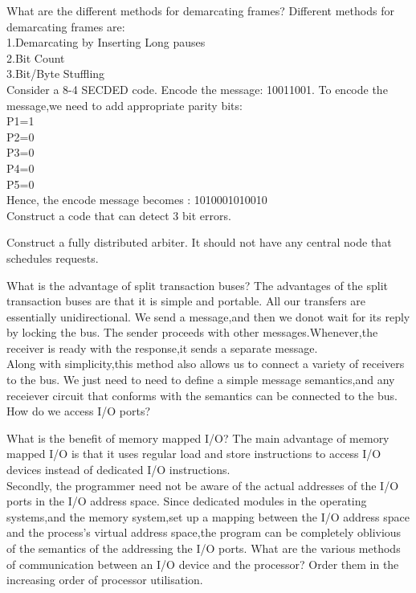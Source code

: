 \begin{ExerciseList}

\Exercise
What are the different methods for demarcating frames?
\Answer 
Different methods for demarcating frames are:\\
1.Demarcating by Inserting Long pauses\\
2.Bit Count\\
3.Bit/Byte Stuffling\\
\Exercise
Consider a 8-4 SECDED code. Encode the message: 10011001.
\Answer
To encode the message,we need to add appropriate parity bits:\\
P1=1\\
P2=0\\
P3=0\\
P4=0\\
P5=0\\
Hence, the encode message becomes :
1010001010010\\
\Exercise[difficulty=2]
Construct a code that can detect 3 bit errors.

\Exercise[difficulty=2]
Construct a fully distributed arbiter. It should not have any central node that schedules requests.

\Exercise
What is the advantage of split transaction buses?
The advantages of the split transaction buses are that it is simple and portable. All our transfers are essentially unidirectional. We send a message,and then we donot wait for its reply by locking the bus. The sender proceeds with other messages.Whenever,the receiver is ready with the response,it sends a separate message.\\
Along with simplicity,this method also allows us to connect a variety of receivers to the bus. We just need to need to define a simple message semantics,and any receiever circuit that conforms with the semantics can be connected to the bus.
\Exercise
How do we access I/O ports?

\Exercise
What is the benefit of memory mapped I/O?
\Answer
The main advantage of memory mapped I/O is that it uses regular load and store instructions to access I/O devices instead of dedicated I/O instructions.\\
Secondly, the programmer need not be aware of the actual addresses of the I/O ports in the I/O address space. Since dedicated modules in the operating systems,and the memory system,set up a mapping between the I/O address space and the process's virtual address space,the program can be completely oblivious of the semantics of the addressing the I/O ports.
\Exercise
What are the various methods of communication between an I/O device and the processor? 
Order them in the increasing order of processor utilisation.


\end{ExerciseList}
